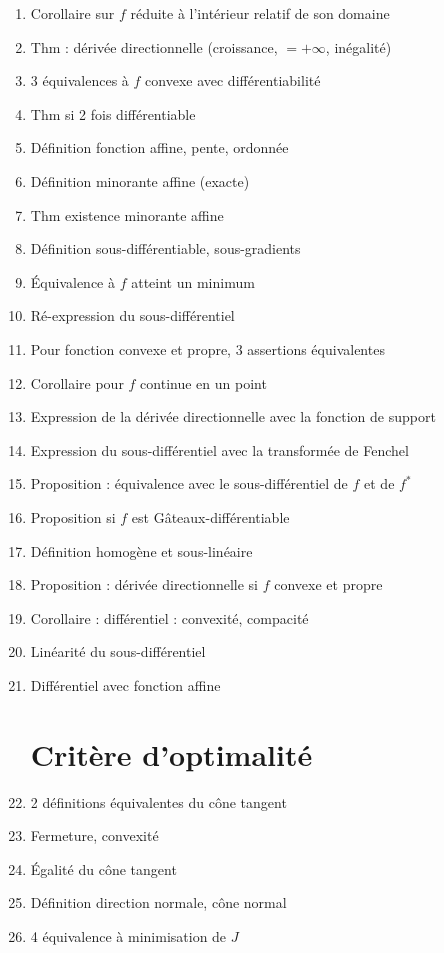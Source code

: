 \documentclass{article}
\begin{document}
\begin{enumerate}
	\item Corollaire sur $f$ réduite à l'intérieur relatif de son domaine
	\item Thm : dérivée directionnelle (croissance, $=+\infty$, inégalité)
	\item 3 équivalences à $f$ convexe avec différentiabilité
	\item Thm si 2 fois différentiable
	\item Définition fonction affine, pente, ordonnée
	\item Définition minorante affine (exacte)
	\item Thm existence minorante affine
	\item Définition sous-différentiable, sous-gradients
	\item Équivalence à $f$ atteint un minimum
	\item Ré-expression du sous-différentiel
	\item Pour fonction convexe et propre, 3 assertions équivalentes
	\item Corollaire pour $f$ continue en un point
	\item Expression de la dérivée directionnelle avec la fonction de support
	\item Expression du sous-différentiel avec la transformée de Fenchel
	\item Proposition : équivalence avec le sous-différentiel de $f$ et de $f^*$
	\item Proposition si $f$ est Gâteaux-différentiable
	\item Définition homogène et sous-linéaire
	\item Proposition : dérivée directionnelle si $f$ convexe et propre
	\item Corollaire : différentiel : convexité, compacité
	\item Linéarité du sous-différentiel
	\item Différentiel avec fonction affine
	\section{Critère d'optimalité}
	\item 2 définitions équivalentes du cône tangent
	\item Fermeture, convexité
	\item Égalité du cône tangent
	\item Définition direction normale, cône normal
	\item 4 équivalence à minimisation de $J$ 
\end{enumerate}
\end{document}
